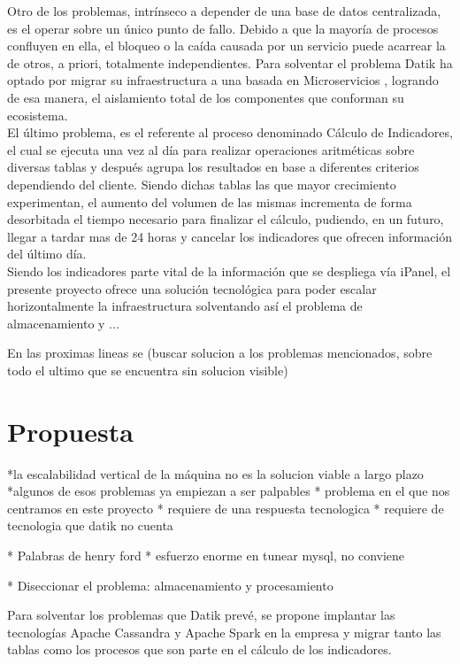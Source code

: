 Otro de los problemas, intrínseco a depender de una base de datos centralizada, es el operar sobre un único punto de fallo. Debido a que la mayoría de procesos confluyen en ella, el bloqueo o la caída causada por un servicio puede acarrear la de otros, a priori, totalmente independientes. Para solventar el problema Datik ha optado por migrar su infraestructura a una basada en Microservicios \cite{newman2015building}, logrando de esa manera, el aislamiento total de los componentes que conforman su ecosistema.\\ 

El último problema, es el referente al proceso denominado Cálculo de Indicadores, el cual se ejecuta una vez al día para realizar operaciones aritméticas sobre diversas tablas y después agrupa los resultados en base a diferentes criterios dependiendo del cliente. Siendo dichas tablas las que mayor crecimiento experimentan, el aumento del volumen de las mismas incrementa de forma desorbitada el tiempo necesario para finalizar el cálculo, pudiendo, en un futuro, llegar a tardar mas de 24 horas y cancelar los indicadores que ofrecen información del último día.\\

Siendo los indicadores parte vital de la información que se despliega vía iPanel, el presente proyecto ofrece una solución tecnológica para poder escalar horizontalmente la infraestructura solventando así el problema de almacenamiento y ...   

En las proximas lineas se (buscar solucion a los problemas mencionados, sobre todo el ultimo que se encuentra sin solucion visible)

\section{Propuesta}

*la escalabilidad vertical de la máquina no es la solucion viable a largo plazo
*algunos de esos problemas ya empiezan a ser palpables
* problema en el que nos centramos en este proyecto
* requiere de una respuesta tecnologica
* requiere de tecnologia que datik no cuenta

* Palabras de henry ford
* esfuerzo enorme en tunear mysql, no conviene

* Diseccionar el problema: almacenamiento y procesamiento

Para solventar los problemas que Datik prevé, se propone implantar las tecnologías Apache Cassandra y Apache Spark en la empresa y migrar tanto las tablas como los procesos que son parte en el cálculo de los indicadores.\\


